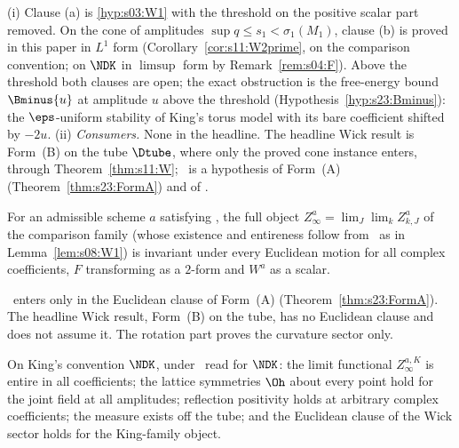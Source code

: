 \begin{remark}[on \Wtwo]\label{rem:s03:W2}
(i) Clause (a) is \cref{hyp:s03:W1} with the threshold on the positive scalar part removed. On the cone of amplitudes $\sup q\le s_1<\sigma_1(M_1)$, clause (b) is proved in this paper in $L^1$ form (Corollary~\ref{cor:s11:W2prime}, on the comparison convention; on $\NDK$ in $\limsup$ form by Remark~\ref{rem:s04:F}). Above the threshold both clauses are open; the exact obstruction is the free-energy bound $\Bminus{u}$ at amplitude $u$ above the threshold (Hypothesis~\ref{hyp:s23:Bminus}): the $\eps$-uniform stability of King's torus model with its bare coefficient shifted by $-2u$.
(ii) \emph{Consumers.} None in the headline. The headline Wick result is Form~(B) on the tube $\Dtube$, where only the proved cone instance enters, through Theorem~\ref{thm:s11:W}; \Wtwo\ is a hypothesis of Form~(A) (Theorem~\ref{thm:s23:FormA}) and of \RW.
\end{remark}

\begin{hypothesis}\label{hyp:s03:RW}
For an admissible scheme $a$ satisfying \Wtwo, the full object $Z^a_\infty=\lim_J\lim_kZ^a_{k,J}$ of the comparison family (whose existence and entireness follow from \Wtwo\ as in Lemma~\ref{lem:s08:W1}) is invariant under every Euclidean motion for all complex coefficients, $F$ transforming as a $2$-form and $W^a$ as a scalar.
\end{hypothesis}

\begin{remark}[on \RW]\label{rem:s03:RW}
\RW\ enters only in the Euclidean clause of Form~(A) (Theorem~\ref{thm:s23:FormA}). The headline Wick result, Form~(B) on the tube, has no Euclidean clause and does not assume it. The rotation part proves the curvature sector only.
\end{remark}

\begin{hypothesis}\label{hyp:s03:FAK}
On King's convention $\NDK$, under \Wtwo\ read for $\NDK$: the limit functional $Z^{a,K}_\infty$ is entire in all coefficients; the lattice symmetries $\Oh$ about every point hold for the joint field at all amplitudes; reflection positivity holds at arbitrary complex coefficients; the measure exists off the tube; and the Euclidean clause of the Wick sector holds for the King-family object.
\end{hypothesis}

